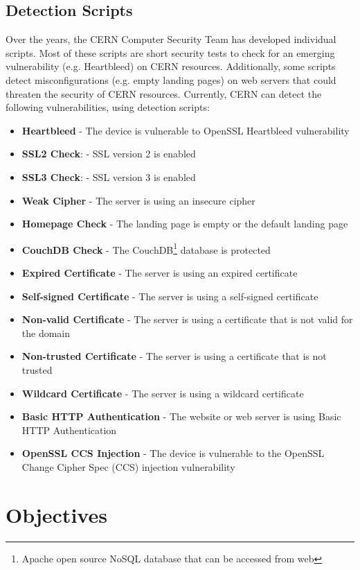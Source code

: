 \subsection{Detection Scripts}
Over the years, the CERN Computer Security Team has developed individual scripts. Most of these scripts are short security tests to check for an emerging vulnerability (e.g. Heartbleed) on CERN resources. Additionally, some scripts detect misconfigurations (e.g. empty landing pages) on web servers that could threaten the security of CERN resources. Currently, CERN can detect the following vulnerabilities, using detection scripts:
\begin{itemize}
\item \textbf{Heartbleed} - The device is vulnerable to OpenSSL Heartbleed vulnerability
\item \textbf{SSL2 Check}: - SSL version 2 is enabled
\item \textbf{SSL3 Check}: - SSL version 3 is enabled
\item \textbf{Weak Cipher} - The server is using an insecure cipher
\item \textbf{Homepage Check} - The landing page is empty or the default landing page
\item \textbf{CouchDB Check} - The CouchDB\footnote{Apache open source NoSQL database that can be accessed from web} database is protected
\item \textbf{Expired Certificate} - The server is using an expired certificate
\item \textbf{Self-signed Certificate} - The server is using a self-signed certificate
\item \textbf{Non-valid Certificate} - The server is using a certificate that is not valid for the domain
\item \textbf{Non-trusted Certificate} - The server is using a certificate that is not trusted
\item \textbf{Wildcard Certificate} - The server is using a wildcard certificate
\item \textbf{Basic HTTP Authentication} - The website or web server is using Basic HTTP Authentication
\item \textbf{OpenSSL CCS Injection} - The device is vulnerable to the OpenSSL Change Cipher Spec (CCS) injection vulnerability

\end{itemize}



\section{Objectives}
